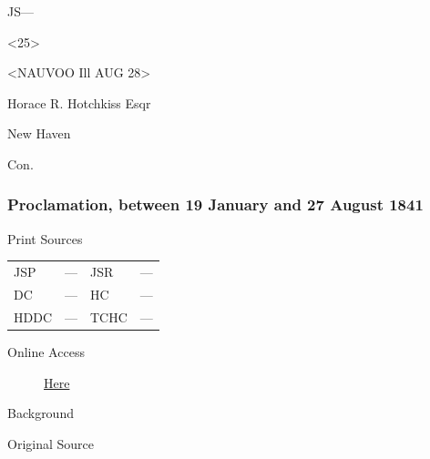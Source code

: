 				\begin{tightright}
					JS---

					<25>
				\end{tightright}

				<NAUVOO Ill AUG 28>

				Horace R. Hotchkiss Esqr

				New Haven

				Con.
				
		\subsubsection{Proclamation, between 19 January and 27 August 1841}
			\label{EMS-1841-JS-19-JAN-27-AUG-1841}
				
			\begin{description}
				\item[Print Sources]
			\end{description}

			\begin{tabular}{p{0.5in}p{1in}p{0.5in}p{1in}}
				JSP	 	& ---		& JSR 		& --- \\
				DC	 	& ---		& HC 		& --- \\
				HDDC 	& ---		& TCHC 		& --- \\
			\end{tabular}
			
			\begin{description}
				\item[Online Access] \href{https://www.josephsmithpapers.org/paper-summary/proclamation-between-19january-and-27august-1841/1}{Here}
			\end{description}
			
			\begin{description}
				\item[Background]
			\end{description}
			
			
			\begin{description}
				\item[Original Source]
			\end{description}
			
